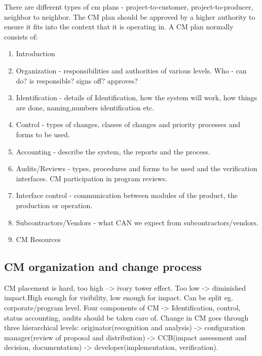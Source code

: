 \documentclass{article}
\begin{document}
There are different types of cm plans - project-to-customer, project-to-producer, neighbor to neighbor. The CM plan should be approved by a higher authority to ensure it fits into the context that
it is operating in. 
A CM plan normally consists of:
\begin{enumerate}
    \item Introduction
    \item Organization - responsibilities and authorities of various levels. Who - can do? is responsible? signs off? approves?
    \item Identification - details of Identification, how the system will work, how things are done, naming,numbers identification etc.
    \item Control - types of changes, classes of changes and priority processes and forms to be used.
    \item Accounting - describe the system, the reports and the process.
    \item Audits/Reviews - types, procedures and forms to be used and the verification interfaces. CM participation in program reviews.
    \item Interface control - communication between modules of the product, the production or operation.
    \item Subcontractors/Vendors - what CAN we expect from subcontractors/vendors.
    \item CM Resources
\end{enumerate}

\subsection{CM organization and change process}
CM placement is hard, too high --> ivory tower effect. Too low -> diminished impact.High enough for visibility, low enough for impact. Can be split eg. corporate/program level.
Four components of CM -> Identification, control, status accounting, audits should be taken care of.
Change in CM goes through three hierarchical levels: originator(recognition and analysis) ->  configuration manager(review of proposal and distribution)
-> CCB(impact assessment and decision, documentation) -> developer(implementation, verification).
\end{document}
